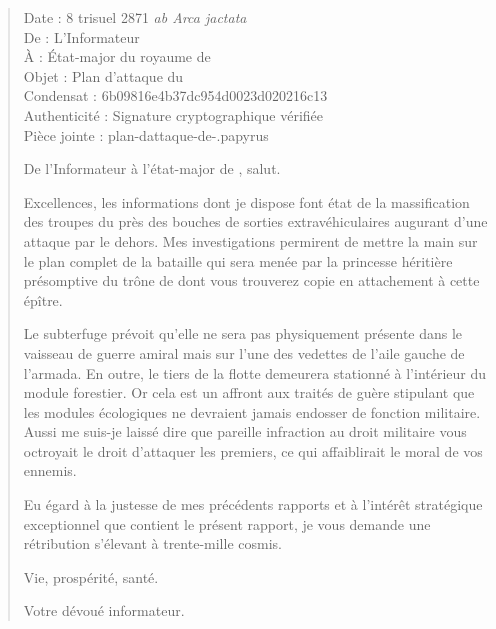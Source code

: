 \begin{quotation}
  \ttfamily\RaggedRight
  \noindent{}Date : 8 trisuel 2871 \emph{ab Arca jactata}%
  \\
  De : L’Informateur\\
  À : État-major du royaume de \campoppose{}\\
  Objet : Plan d’attaque du \campprincipal{}\\
  Condensat : 6b09816e4b37dc954d0023d020216c13\\
  Authenticité : Signature cryptographique vérifiée\\
  Pièce jointe : plan-dattaque-de-\campoppose{}.papyrus
  \nopagebreak\vspace{1em}

  De l’Informateur à l’état-major de \campoppose{}, salut.
  \nopagebreak\vspace{1em}

  Excellences, les informations dont je dispose font état de la massification des troupes du \campprincipal{} près des bouches de sorties extravéhiculaires augurant d’une attaque par le dehors. Mes investigations permirent de mettre la main sur le plan complet de la bataille qui sera menée par la princesse héritière présomptive du trône de \campprincipal{} dont vous trouverez copie en attachement à cette épître.

  Le subterfuge prévoit qu’elle ne sera pas physiquement présente dans le vaisseau de guerre amiral mais sur l’une des vedettes de l’aile gauche de l’armada. En outre, le tiers de la flotte demeurera stationné à l’intérieur du module forestier. Or cela est un affront aux traités de guère stipulant que les modules écologiques ne devraient jamais endosser de fonction militaire. Aussi me suis-je laissé dire que pareille infraction au droit militaire vous octroyait le droit d’attaquer les premiers, ce qui affaiblirait le moral de vos ennemis.

  Eu égard à la justesse de mes précédents rapports et à l’intérêt stratégique exceptionnel que contient le présent rapport, je vous demande une rétribution s’élevant à trente-mille cosmis.

  \nopagebreak\vspace{1em}
  Vie, prospérité, santé.

  \nopagebreak\vspace{1em}
  \hfill Votre dévoué informateur.
\end{quotation}


